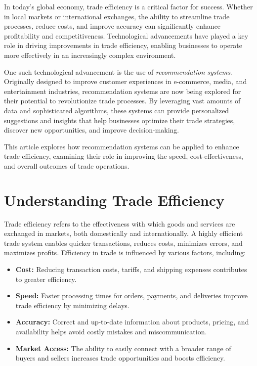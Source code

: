 \documentclass[10pt,twocolumn,twoside,slovak,a4paper]{article}
\begin{document}
In today’s global economy, trade efficiency is a critical factor for success. Whether in local markets or international exchanges, the ability to streamline trade processes, reduce costs, and improve accuracy can significantly enhance profitability and competitiveness. Technological advancements have played a key role in driving improvements in trade efficiency, enabling businesses to operate more effectively in an increasingly complex environment.

One such technological advancement is the use of \textit{recommendation systems}. Originally designed to improve customer experiences in e-commerce, media, and entertainment industries, recommendation systems are now being explored for their potential to revolutionize trade processes. By leveraging vast amounts of data and sophisticated algorithms, these systems can provide personalized suggestions and insights that help businesses optimize their trade strategies, discover new opportunities, and improve decision-making.

This article explores how recommendation systems can be applied to enhance trade efficiency, examining their role in improving the speed, cost-effectiveness, and overall outcomes of trade operations.



\section{Understanding Trade Efficiency}

Trade efficiency refers to the effectiveness with which goods and services are exchanged in markets, both domestically and internationally. A highly efficient trade system enables quicker transactions, reduces costs, minimizes errors, and maximizes profits. Efficiency in trade is influenced by various factors, including:

\begin{itemize}
    \item \textbf{Cost:} Reducing transaction costs, tariffs, and shipping expenses contributes to greater efficiency.
    \item \textbf{Speed:} Faster processing times for orders, payments, and deliveries improve trade efficiency by minimizing delays.
    \item \textbf{Accuracy:} Correct and up-to-date information about products, pricing, and availability helps avoid costly mistakes and miscommunication.
    \item \textbf{Market Access:} The ability to easily connect with a broader range of buyers and sellers increases trade opportunities and boosts efficiency.
\end{itemize}
\end{document}
